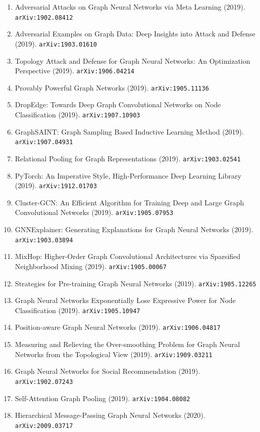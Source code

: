 \documentclass[11pt]{article}
\begin{document}
\begin{enumerate}
  \item Adversarial Attacks on Graph Neural Networks via Meta Learning (2019). \texttt{arXiv:1902.08412}
  \item Adversarial Examples on Graph Data: Deep Insights into Attack and
  Defense (2019). \texttt{arXiv:1903.01610}
  \item Topology Attack and Defense for Graph Neural Networks: An Optimization
  Perspective (2019). \texttt{arXiv:1906.04214}
  \item Provably Powerful Graph Networks (2019). \texttt{arXiv:1905.11136}
  \item DropEdge: Towards Deep Graph Convolutional Networks on Node
  Classification (2019). \texttt{arXiv:1907.10903}
  \item GraphSAINT: Graph Sampling Based Inductive Learning Method (2019). \texttt{arXiv:1907.04931}
  \item Relational Pooling for Graph Representations (2019). \texttt{arXiv:1903.02541}
  \item PyTorch: An Imperative Style, High-Performance Deep Learning Library (2019). \texttt{arXiv:1912.01703}
  \item Cluster-GCN: An Efficient Algorithm for Training Deep and Large Graph
  Convolutional Networks (2019). \texttt{arXiv:1905.07953}
  \item GNNExplainer: Generating Explanations for Graph Neural Networks (2019). \texttt{arXiv:1903.03894}
  \item MixHop: Higher-Order Graph Convolutional Architectures via Sparsified
  Neighborhood Mixing (2019). \texttt{arXiv:1905.00067}
  \item Strategies for Pre-training Graph Neural Networks (2019). \texttt{arXiv:1905.12265}
  \item Graph Neural Networks Exponentially Lose Expressive Power for Node
  Classification (2019). \texttt{arXiv:1905.10947}
  \item Position-aware Graph Neural Networks (2019). \texttt{arXiv:1906.04817}
  \item Measuring and Relieving the Over-smoothing Problem for Graph Neural
  Networks from the Topological View (2019). \texttt{arXiv:1909.03211}
  \item Graph Neural Networks for Social Recommendation (2019). \texttt{arXiv:1902.07243}
  \item Self-Attention Graph Pooling (2019). \texttt{arXiv:1904.08082}
  \item Hierarchical Message-Passing Graph Neural Networks (2020). \texttt{arXiv:2009.03717}

\end{enumerate}
\end{document}
